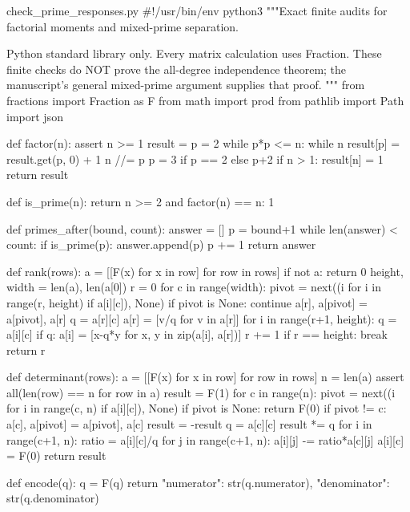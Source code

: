 \begin{filecontents*}[overwrite]{check_prime_responses.py}
#!/usr/bin/env python3
"""Exact finite audits for factorial moments and mixed-prime separation.

Python standard library only.  Every matrix calculation uses Fraction.
These finite checks do NOT prove the all-degree independence theorem;
the manuscript's general mixed-prime argument supplies that proof.
"""
from fractions import Fraction as F
from math import prod
from pathlib import Path
import json


def factor(n):
    assert n >= 1
    result = {}
    p = 2
    while p*p <= n:
        while n %
            result[p] = result.get(p, 0) + 1
            n //= p
        p = 3 if p == 2 else p+2
    if n > 1:
        result[n] = 1
    return result


def is_prime(n):
    return n >= 2 and factor(n) == {n: 1}


def primes_after(bound, count):
    answer = []
    p = bound+1
    while len(answer) < count:
        if is_prime(p):
            answer.append(p)
        p += 1
    return answer


def rank(rows):
    a = [[F(x) for x in row] for row in rows]
    if not a:
        return 0
    height, width = len(a), len(a[0])
    r = 0
    for c in range(width):
        pivot = next((i for i in range(r, height) if a[i][c]), None)
        if pivot is None:
            continue
        a[r], a[pivot] = a[pivot], a[r]
        q = a[r][c]
        a[r] = [v/q for v in a[r]]
        for i in range(r+1, height):
            q = a[i][c]
            if q:
                a[i] = [x-q*y for x, y in zip(a[i], a[r])]
        r += 1
        if r == height:
            break
    return r


def determinant(rows):
    a = [[F(x) for x in row] for row in rows]
    n = len(a)
    assert all(len(row) == n for row in a)
    result = F(1)
    for c in range(n):
        pivot = next((i for i in range(c, n) if a[i][c]), None)
        if pivot is None:
            return F(0)
        if pivot != c:
            a[c], a[pivot] = a[pivot], a[c]
            result = -result
        q = a[c][c]
        result *= q
        for i in range(c+1, n):
            ratio = a[i][c]/q
            for j in range(c+1, n):
                a[i][j] -= ratio*a[c][j]
            a[i][c] = F(0)
    return result


def encode(q):
    q = F(q)
    return {"numerator": str(q.numerator), "denominator": str(q.denominator)}



\end{filecontents*}
